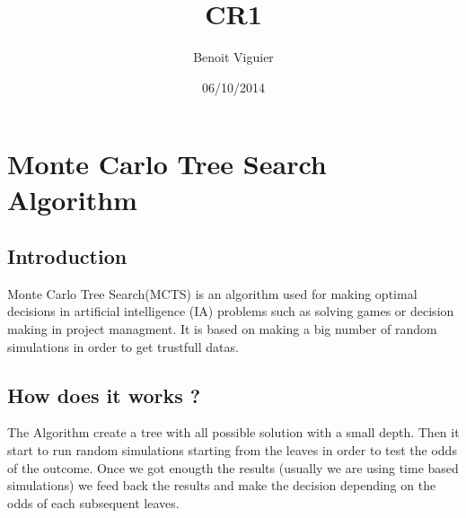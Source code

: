 \documentclass[12pt]{article}
\title{CR1}
\author{Benoit Viguier}
\date{06/10/2014}
\begin{document}
\maketitle
\section{Monte Carlo Tree Search Algorithm}
\subsection{Introduction}
Monte Carlo Tree Search(MCTS) is an algorithm used for making optimal decisions in artificial intelligence (IA) problems such as solving games or decision making in project managment. It is based on making a big number of random simulations in order to get trustfull datas.
\subsection{How does it works ?}
The Algorithm create a tree with all possible solution with a small depth.
Then it start to run random simulations starting from the leaves in order to test the odds of the outcome.
Once we got enougth the results (usually we are using time based simulations) we feed back the results and make the decision depending on the odds of each subsequent leaves.
\end{document}
